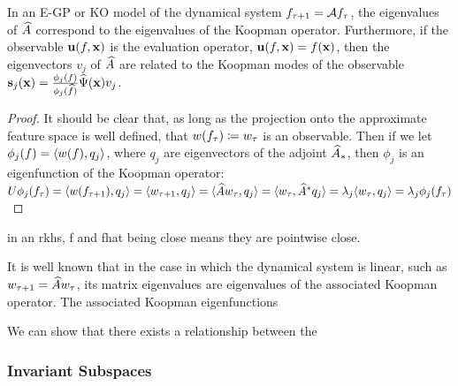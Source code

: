 {\begin{theorem}
	In an E-GP or KO model of the dynamical system $ f_{\tau+1} = \mathcal{A} f_{\tau}$, the eigenvalues of $\widehat{A}$ correspond to the eigenvalues of the Koopman operator. Furthermore, if the observable $\mathbf{u}(f,\mathbf{x})$ is the evaluation operator, $\mathbf{u}(f,\mathbf{x}) = f(\mathbf{x})$, then the eigenvectors $v_j$ of $\widehat{A}$ are related to the Koopman modes of the observable $\mathbf{s}_j (\mathbf{x}) = \frac{\phi_j(f)}{\phi_j(\widehat{f})} \widehat{\Psi}(\mathbf{x}) v_j$.
\end{theorem}
\begin{proof}
	It should be clear that, as long as the projection onto the approximate feature space is well defined, that $w(f_{\tau}) \coloneqq w_{\tau} $ is an observable. Then if we let $\phi_j(f) = \langle w(f), q_j \rangle$, where $q_j$ are eigenvectors of the adjoint $\widehat{A}_{\ast}$, then $\phi_j$ is an eigenfunction of the Koopman operator: $U \phi_j(f_{\tau}) = \langle w(f_{\tau+1}), q_j \rangle = \langle w_{\tau+1}, q_j \rangle = \langle \widehat{A} w_{\tau}, q_j \rangle =  \langle w_{\tau}, \widehat{A}^{\ast} q_j \rangle =  \lambda_j \langle w_{\tau}, q_j \rangle =  \lambda_j \phi_j(f_{\tau})$ %
\end{proof}

in an rkhs, f and fhat being close means they are pointwise close.

It is well known that in the case in which the dynamical system is linear, such as $w_{\tau+1} = \widehat{A}w_{\tau}$, its matrix eigenvalues are eigenvalues of the associated Koopman operator. The associated Koopman eigenfunctions

We can show that there exists a relationship between the 
}

\subsubsection{Invariant Subspaces}


